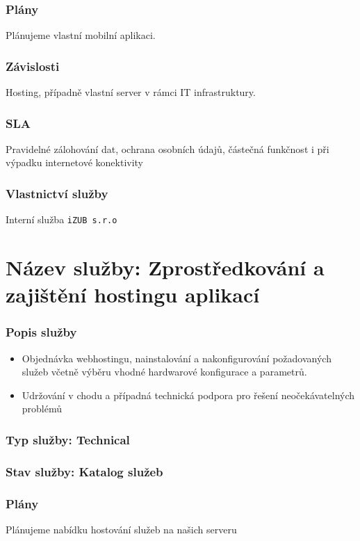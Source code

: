 \documentclass[11pt, a4paper, titlepage]{article}
\begin{document}
	\subsubsection*{Plány}
	Plánujeme vlastní mobilní aplikaci.

	\subsubsection*{Závislosti}
	Hosting, případně vlastní server v rámci IT infrastruktury.

	\subsubsection*{SLA}
	Pravidelné zálohování dat, ochrana osobních údajů, částečná funkčnost i při výpadku internetové konektivity

	\subsubsection*{Vlastnictví služby}
	Interní služba \texttt{iZUB s.r.o}

	\section*{Název služby: Zprostředkování a zajištění hostingu aplikací}	

	\subsubsection*{Popis služby}
	\begin{itemize}
		\item Objednávka webhostingu, nainstalování a nakonfigurování požadovaných služeb včetně výběru vhodné hardwarové konfigurace a parametrů.
		\item Udržování v chodu a případná technická podpora pro řešení neočekávatelných problémů
	\end{itemize}

	\subsubsection*{Typ služby: Technical}

	\subsubsection*{Stav služby: Katalog služeb}

	\subsubsection*{Plány}
	Plánujeme nabídku hostování služeb na našich serveru
\end{document}
